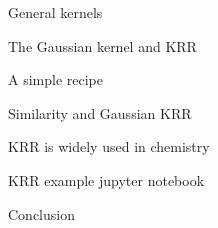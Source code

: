 \begin{frame}[t]{General kernels}

\end{frame}
\begin{frame}[t]{The Gaussian kernel and KRR}

\end{frame}
\begin{frame}[t]{A simple recipe}

\end{frame}
\begin{frame}[t]{Similarity and Gaussian KRR}

\end{frame}
\begin{frame}{KRR is widely used in chemistry}

\end{frame}
\begin{frame}{KRR example}
jupyter notebook
\end{frame}
\begin{frame}{Conclusion}

\end{frame}